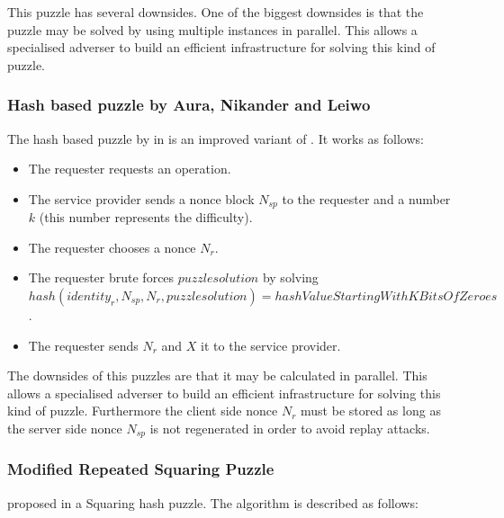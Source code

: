 This puzzle has several downsides. One of the biggest downsides is that the puzzle may be solved by using multiple instances in parallel. This allows a specialised adverser to build an efficient infrastructure for solving this kind of puzzle.

\subsubsection{Hash based puzzle by Aura, Nikander and Leiwo} 
The hash based puzzle by \citeauthor{aura2000resistant} in \cite{aura2000resistant} is an improved variant of \cite{juels1999client}. It works as follows:

\begin{itemize}
	\item The requester requests an operation.
	\item The service provider sends a nonce block $N_{sp}$ to the requester and a number $k$ (this number represents the difficulty).
	\item The requester chooses a nonce $N_{r}$.
	\item The requester brute forces  $puzzlesolution$ by solving $hash(identity_r, N_{sp}, N_{r}, puzzlesolution)=hashValueStartingWithKBitsOfZeroes$.
	\item The requester sends $N_r$ and $X$ it to the service provider.
\end{itemize}

The downsides of this puzzles are that it may be calculated in parallel. This allows a specialised adverser to build an efficient infrastructure for solving this kind of puzzle. Furthermore the client side nonce $N_r$ must be stored as long as the server side nonce $N_{sp}$ is not regenerated in order to avoid replay attacks.

\subsubsection{Modified Repeated Squaring Puzzle} 
\citeauthor{jeckmans2009practical} proposed in \cite{jeckmans2009practical} a Squaring hash puzzle. The algorithm is described as follows:


